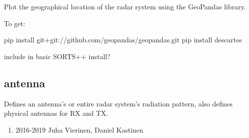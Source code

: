 \documentclass[letterpaper,10pt,english]{sphinxmanual}
\begin{document}

\begin{fulllineitems}
\label{\detokenize{modules/radar_config:radar_config.plot_radar_earth}}
\end{fulllineitems}


\begin{fulllineitems}
\label{\detokenize{modules/radar_config:radar_config.plot_radar_geo}}
Plot the geographical location of the radar system using the GeoPandas library.

To get:

pip install git+git://github.com/geopandas/geopandas.git
pip install descartes

include in basic SORTS++ install?

\end{fulllineitems}



\subsection{antenna}
\label{\detokenize{modules/antenna:module-antenna}}\label{\detokenize{modules/antenna:antenna}}\label{\detokenize{modules/antenna::doc}}
Defines an antenna’s or entire radar system’s radiation pattern, also defines physical antennas for RX and TX.
\begin{enumerate}
\def\theenumi{\alph{enumi}}
\def\labelenumi{(\theenumi )}
\makeatletter\def\p@enumii{\p@enumi (\theenumi )}\makeatother
\setcounter{enumi}{2}
\item {} 
2016-2019 Juha Vierinen, Daniel Kastinen

\end{enumerate}
\end{document}
